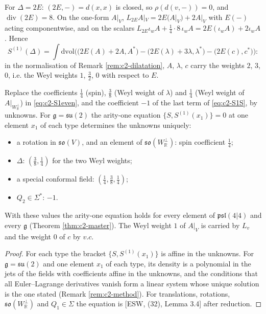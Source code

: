 \begin{example}
\label{ex:c2-dil}
For $\Delta=2E$: $(2E,-)=d(x,x)$ is closed, so $\rho(d(v,-))=0$, and $\operatorname{div}(2E)=8$. On the one-form $A|_V$, $L_{2E}A|_V=2E(A|_V)+2A|_V$ with $E(-)$ acting componentwise, and on the scalars $L_{2E}\iota_wA+\tfrac14\cdot8\,\iota_wA=2E(\iota_wA)+2\iota_wA$. Hence
\[
S^{(1)}(\Delta)=\int\mathrm{dvol}\Big(\big(2E(A)+2A,A^*\big)-\big(2E(\lambda)+3\lambda,\lambda^*\big)-\big(2E(c),c^*\big)\Big):
\]
in the normalisation of Remark \ref{rem:c2-dilatation}, $A$, $\lambda$, $c$ carry the weights $2$, $3$, $0$, i.e. the Weyl weights $1$, $\tfrac32$, $0$ with respect to $E$.
\end{example}

\begin{proposition}
\label{prop:c2-coeff}
Replace the coefficients $\tfrac14$ (spin), $\tfrac38$ (Weyl weight of $\lambda$) and $\tfrac14$ (Weyl weight of $A|_{W_{\mathbb R}^\perp}$) in \eqref{eq:c2-S1even}, and the coefficient $-1$ of the last term of \eqref{eq:c2-S1S}, by unknowns. For $\mathfrak g=\mathfrak{su}(2)$ the arity-one equation $\{S,S^{(1)}(x_1)\}=0$ at one element $x_1$ of each type determines the unknowns uniquely:
\begin{itemize}
\item a rotation in $\mathfrak{so}(V)$, and an element of $\mathfrak{so}(W_{\mathbb R}^\perp)$: spin coefficient $\tfrac14$;
\item $\Delta$: $(\tfrac38,\tfrac14)$ for the two Weyl weights;
\item a special conformal field: $(\tfrac14,\tfrac38,\tfrac14)$;
\item $Q_2\in\Sigma^*$: $-1$.
\end{itemize}
With these values the arity-one equation holds for every element of $\mathfrak{psl}(4|4)$ and every $\mathfrak g$ (Theorem \ref{thm:c2-master}). The Weyl weight $1$ of $A|_V$ is carried by $L_v$ and the weight $0$ of $c$ by $v.c$.
\end{proposition}

\begin{proof}
For each type the bracket $\{S,S^{(1)}(x_1)\}$ is affine in the unknowns. For $\mathfrak g=\mathfrak{su}(2)$ and one element $x_1$ of each type, its density is a polynomial in the jets of the fields with coefficients affine in the unknowns, and the conditions that all Euler--Lagrange derivatives vanish form a linear system whose unique solution is the one stated (Remark \ref{rem:c2-method}). For translations, rotations, $\mathfrak{so}(W_{\mathbb R}^\perp)$ and $Q_1\in\Sigma$ the equation is [ESW, (32), Lemma 3.4] after reduction.
\end{proof}


